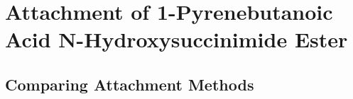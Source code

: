 \documentclass[
  a4paper,
]{scrbook}
\begin{document}
\hypertarget{sec-PBASE}{%
\section{Attachment of 1-Pyrenebutanoic Acid N-Hydroxysuccinimide
Ester}\label{sec-PBASE}}

\hypertarget{comparing-attachment-methods}{%
\subsection{Comparing Attachment
Methods}\label{comparing-attachment-methods}}

\begin{figure}

\begin{minipage}[t]{0.47\linewidth}

{\centering 


}

\subcaption{\label{fig-pbase-stable-1}}
\end{minipage}%
%
\begin{minipage}[t]{0.05\linewidth}

{\centering 

~

}

\end{minipage}%
%
\begin{minipage}[t]{0.47\linewidth}


\end{minipage}
\end{figure}
\end{document}
